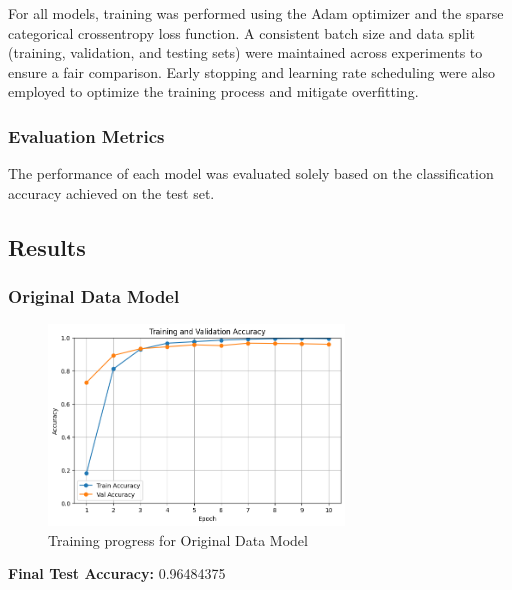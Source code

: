 \documentclass[a4paper,12pt]{article}
\begin{document}
For all models, training was performed using the Adam optimizer and the sparse categorical crossentropy loss function. A consistent batch size and data split (training, validation, and testing sets) were maintained across experiments to ensure a fair comparison. Early stopping and learning rate scheduling were also employed to optimize the training process and mitigate overfitting.



\subsubsection{Evaluation Metrics}
The performance of each model was evaluated solely based on the classification accuracy achieved on the test set.


\subsection{Results}

\subsubsection{Original Data Model}
\begin{figure}[H]
\centering
\includegraphics[width=0.7\textwidth]{model1_prog.png} %
\caption{Training progress for Original Data Model}
\label{fig:model1_prog}
\end{figure}

\textbf{Final Test Accuracy: } 0.96484375
\end{document}
